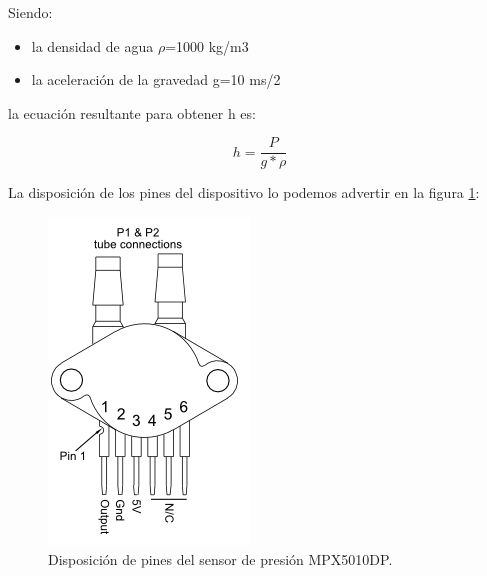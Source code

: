 Siendo: 
\begin{itemize}
\item la densidad de agua $\rho$=1000 kg/m3  
\item la aceleración de la gravedad g=10 ms/2
\end{itemize}
la ecuación resultante para obtener h es: 

\begin{equation}
 \label{eq:presión}
	 h = \frac{P}{g*\rho}	
\end{equation}

\vspace{2cm}
La disposición de los pines del dispositivo lo podemos advertir en la figura \ref{fig:disposición de pines del sensor}:
\begin{figure}[h]
\centering
\includegraphics[scale=.65]{./Figures/DisposicionDePinesSensor.png}
\caption{Disposición de pines del sensor de presión MPX5010DP.}
\label{fig:disposición de pines del sensor}
\end{figure}

